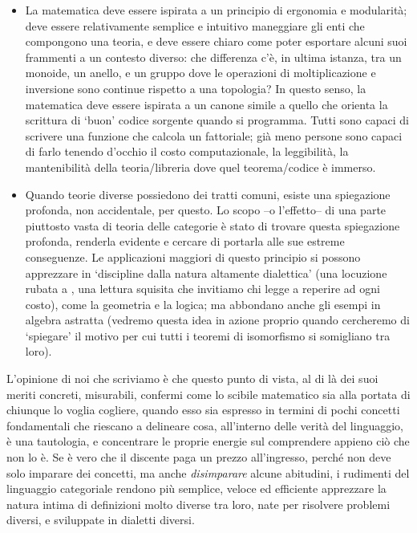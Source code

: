 \begin{itemize}
{	In teoria delle categorie, invece, il prodotto cartesiano \(A\times B\) è definito in maniera molto più snella, e non meno rigorosa.}
	\item La matematica deve essere ispirata a un principio di ergonomia e modularità; deve essere relativamente semplice e intuitivo maneggiare gli enti che compongono una teoria, e deve essere chiaro come poter esportare alcuni suoi frammenti a un contesto diverso: che differenza c'è, in ultima istanza, tra un monoide, un anello, e un gruppo dove le operazioni di moltiplicazione e inversione sono continue rispetto a una topologia? In questo senso, la matematica deve essere ispirata a un canone simile a quello che orienta la scrittura di `buon' codice sorgente quando si programma. Tutti sono capaci di scrivere una funzione che calcola un fattoriale; già meno persone sono capaci di farlo tenendo d'occhio il costo computazionale, la leggibilità, la mantenibilità della teoria/libreria dove quel teorema/codice è immerso.
	\item Quando teorie diverse possiedono dei tratti comuni, esiste una spiegazione profonda, non accidentale, per questo. Lo scopo --o l'effetto-- di una parte piuttosto vasta di teoria delle categorie è stato di trovare questa spiegazione profonda, renderla evidente e cercare di portarla alle sue estreme conseguenze. Le applicazioni maggiori di questo principio si possono apprezzare in `discipline dalla natura altamente dialettica' (una locuzione rubata a \cite{lawvere1999profilo}, una lettura squisita che invitiamo chi legge a reperire ad ogni costo), come la geometria e la logica; ma abbondano anche gli esempi in algebra astratta (vedremo questa idea in azione proprio quando cercheremo di `spiegare' il motivo per cui tutti i teoremi di isomorfismo si somigliano tra loro).
\end{itemize}
L'opinione di noi che scriviamo è che questo punto di vista, al di là dei suoi meriti concreti, misurabili, confermi come lo scibile matematico sia alla portata di chiunque lo voglia cogliere, quando esso sia espresso in termini di pochi concetti fondamentali che riescano a delineare cosa, all'interno delle verità del linguaggio, è una tautologia, e concentrare le proprie energie sul comprendere appieno ciò che non lo è. Se è vero che il discente paga un prezzo all'ingresso, perché non deve solo imparare dei concetti, ma anche \emph{disimparare} alcune abitudini, i rudimenti del linguaggio categoriale rendono più semplice, veloce ed efficiente apprezzare la natura intima di definizioni molto diverse tra loro, nate per risolvere problemi diversi, e sviluppate in dialetti diversi.

